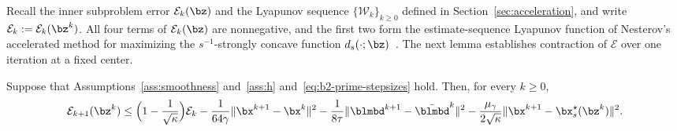 Recall the inner subproblem error \(\mathcal E_k(\bz)\) and the Lyapunov
sequence \(\{\mathcal W_k\}_{k\ge0}\) defined in
Section~\ref{sec:acceleration}, and write
\(\mathcal E_k:=\mathcal E_k(\bz^k)\). All four terms of
\(\mathcal E_k(\bz)\) are nonnegative, and the
first two form the estimate-sequence Lyapunov function of Nesterov's
accelerated method for maximizing the \(s^{-1}\)-strongly concave function
\(d_s(\cdot;\bz)\)~\cite{nesterov2018lectures,wilson2021lyapunov}. The next
lemma establishes contraction of \(\mathcal E\) over one iteration at a fixed
center.

\begin{lemma}
\label{lem:b2-prime-fixed-center-contraction}
Suppose that Assumptions~\ref{ass:smoothness} and~\ref{ass:h}
and~\eqref{eq:b2-prime-stepsizes} hold. Then, for every \(k\ge0\),
\[
    \mathcal E_{k+1}(\bz^k)
    \le\Bigl(1-\frac{1}{\sqrt{\kappa}}\Bigr)\mathcal E_k
    -\frac{1}{64\gamma}\|\bx^{k+1}-\bx^k\|^2
    -\frac{1}{8\tau}\|\blmbd^{k+1}-\bar{\blmbd}^k\|^2
    -\frac{\mu_\gamma}{2\sqrt{\kappa}}\|\bx^{k+1}-\bx_s^\star(\bz^k)\|^2 .
\]
\end{lemma}

